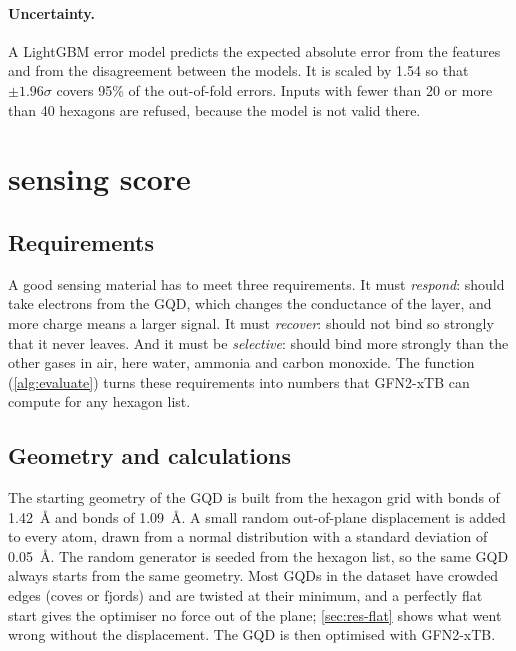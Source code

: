 \paragraph{Uncertainty.} A LightGBM error model predicts the expected absolute error from the
features and from the disagreement between the models. It is scaled by 1.54 so that
\(\pm1.96\sigma\) covers 95\% of the out-of-fold errors. Inputs with fewer than 20 or more than
40 hexagons are refused, because the model is not valid there.

\section{\NOtwo{} sensing score}
\label{sec:score}

\subsection{Requirements}

A good  sensing material has to meet three requirements. It must \emph{respond}: 
should take electrons from the GQD, which changes the conductance of the layer, and more charge
means a larger signal. It must \emph{recover}:  should not bind so strongly that it never
leaves. And it must be \emph{selective}:  should bind more strongly than the other gases in
air, here water, ammonia and carbon monoxide. The function 
(\cref{alg:evaluate}) turns these requirements into numbers that GFN2-xTB can compute for any
hexagon list.

\subsection{Geometry and calculations}

The starting geometry of the GQD is built from the hexagon grid with  bonds of 1.42~\AA{} and
 bonds of 1.09~\AA{}. A small random out-of-plane displacement is added to every atom,
drawn from a normal distribution with a standard deviation of 0.05~\AA. The random generator is
seeded from the hexagon list, so the same GQD always starts from the same geometry. Most
GQDs in the dataset have crowded edges (coves or fjords) and are twisted at their minimum, and a
perfectly flat start gives the optimiser no force out of the plane; \cref{sec:res-flat} shows what
went wrong without the displacement. The GQD is then optimised with GFN2-xTB.

